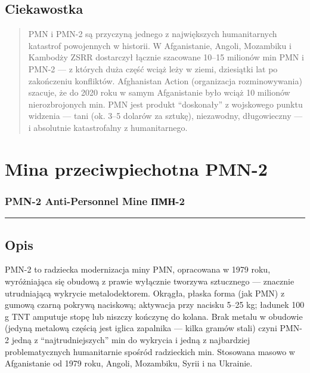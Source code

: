 \documentclass[12pt,openany,oneside]{book}
\begin{document}
\section{Ciekawostka}\label{ciekawostka-107}

\begin{quote}
PMN i PMN-2 są przyczyną jednego z największych humanitarnych katastrof
powojennych w historii. W Afganistanie, Angoli, Mozambiku i Kambodży
ZSRR dostarczył łącznie szacowane 10--15 milionów min PMN i PMN-2 --- z
których duża część wciąż leży w ziemi, dziesiątki lat po zakończeniu
konfliktów. Afghanistan Action (organizacja rozminowywania) szacuje, że
do 2020 roku w samym Afganistanie było wciąż 10 milionów nierozbrojonych
min. PMN jest produkt ``doskonały'' z wojskowego punktu widzenia ---
tani (ok. 3--5 dolarów za sztukę), niezawodny, długowieczny --- i
absolutnie katastrofalny z humanitarnego.
\end{quote}

\chapter{Mina przeciwpiechotna PMN-2}\label{mina-przeciwpiechotna-pmn-2}

\subsection{PMN-2 Anti-Personnel Mine \textbar{}
ПМН-2}\label{pmn-2-anti-personnel-mine-ux43fux43cux43d-2}

\begin{center}\rule{0.5\linewidth}{0.5pt}\end{center}

\section{Opis}\label{opis-108}

PMN-2 to radziecka modernizacja miny PMN, opracowana w 1979 roku,
wyróżniająca się obudową z prawie wyłącznie tworzywa sztucznego ---
znacznie utrudniającą wykrycie metalodektorem. Okrągła, płaska forma
(jak PMN) z gumową czarną pokrywą naciskową; aktywacja przy nacisku
5--25 kg; ładunek 100 g TNT amputuje stopę lub niszczy kończynę do
kolana. Brak metalu w obudowie (jedyną metalową częścią jest iglica
zapalnika --- kilka gramów stali) czyni PMN-2 jedną z
``najtrudniejszych'' min do wykrycia i jedną z najbardziej
problematycznych humanitarnie spośród radzieckich min. Stosowana masowo
w Afganistanie od 1979 roku, Angoli, Mozambiku, Syrii i na Ukrainie.
\end{document}
